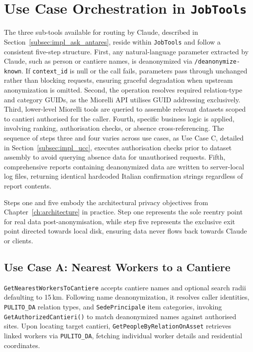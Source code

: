 \section{Use Case Orchestration in \texttt{JobTools}}
\label{sec:impl_jobtools}

The three sub-tools available for routing by Claude, described in Section~\ref{subsec:impl_ask_antares}, reside within \texttt{JobTools} and follow a consistent five-step structure. First, any natural-language parameter extracted by Claude, such as person or cantiere names, is deanonymized via \texttt{/deanonymize-known}. If \texttt{context\_id} is null or the call fails, parameters pass through unchanged rather than blocking requests, ensuring graceful degradation when upstream anonymization is omitted. Second, the operation resolves required relation-type and category GUIDs, as the Miorelli API utilises GUID addressing exclusively. Third, lower-level Miorelli tools are queried to assemble relevant datasets scoped to cantieri authorised for the caller. Fourth, specific business logic is applied, involving ranking, authorisation checks, or absence cross-referencing. The sequence of steps three and four varies across use cases, as Use Case C, detailed in Section~\ref{subsec:impl_ucc}, executes authorisation checks prior to dataset assembly to avoid querying absence data for unauthorised requests. Fifth, comprehensive reports containing deanonymized data are written to server-local log files, returning identical hardcoded Italian confirmation strings regardless of report contents.

Steps one and five embody the architectural privacy objectives from Chapter~\ref{ch:architecture} in practice. Step one represents the sole reentry point for real data post-anonymisation, while step five represents the exclusive exit point directed towards local disk, ensuring data never flows back towards Claude or clients.

\subsection{Use Case A: Nearest Workers to a Cantiere}
\label{subsec:impl_uca}

\texttt{GetNearestWorkersToCantiere} accepts cantiere names and optional search radii defaulting to 15\,km. Following name deanonymization, it resolves caller identities, \texttt{PULITO\_DA} relation types, and \texttt{SedePrincipale} item categories, invoking \texttt{GetAuthorizedCantieri()} to match deanonymized names against authorised sites. Upon locating target cantieri, \texttt{GetPeopleByRelationOnAsset} retrieves linked workers via \texttt{PULITO\_DA}, fetching individual worker details and residential coordinates.

